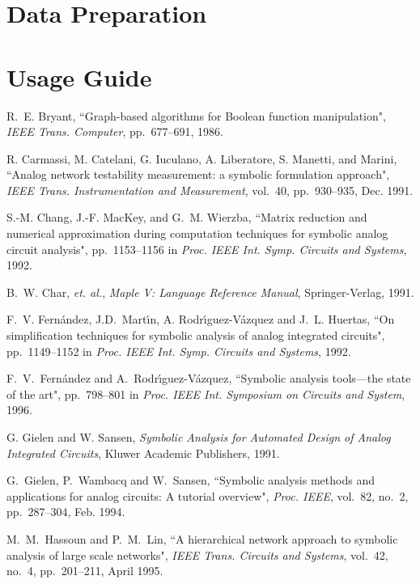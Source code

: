 \section{Data Preparation}


\section{Usage Guide}
\label{sec:usage}

\begin{thebibliography}{99}

R.~E. Bryant,
``Graph-based algorithms for Boolean function manipulation",
{\it IEEE Trans. Computer}, pp.~677--691, 1986.

R. Carmassi, M. Catelani, G. Iuculano, A. Liberatore,
S. Manetti, and Marini,
``Analog network testability measurement:
a symbolic formulation approach",
{\it IEEE Trans. Instrumentation and Measurement},
vol.~40, pp.~930--935, Dec. 1991.

S.-M. Chang, J.-F. MacKey, and G.~M. Wierzba,
``Matrix reduction and numerical approximation
during computation techniques for symbolic analog
circuit analysis",
pp.~1153--1156 in
{\it Proc. IEEE Int. Symp. Circuits and Systems},
1992.

B.~W. Char, {\it et. al.},
{\it Maple V: Language Reference Manual},
Springer-Verlag,  1991.

F.~V. Fern\'{a}ndez, J.D.~Mart\'{\i}n, A. Rodr\'{\i}guez-V\'{a}zquez 
and J.~L. Huertas, 
``On simplification techniques for symbolic
analysis of analog integrated circuits", 
pp.~1149--1152 in {\it Proc. IEEE Int. Symp. Circuits and Systems}, 1992.

F.~V.~Fern\'andez and A.~Rodr\'{\i}guez-V\'azquez,
``Symbolic analysis tools---the state of the art", pp.~798--801 in 
{\it Proc. IEEE Int. Symposium on Circuits and System}, 1996.

G. Gielen and W. Sansen,
{\em Symbolic Analysis for Automated Design of Analog Integrated Circuits}, 
Kluwer Academic Publishers, 1991.

G.~Gielen, P.~Wambacq and W.~Sansen,
``Symbolic analysis methods and applications for 
analog circuits: A tutorial overview",
{\it Proc. IEEE}, vol.~82, no.~2, pp.~287--304, Feb. 1994. 

M.~M.~Hassoun and P.~M.~Lin,
``A hierarchical network approach to symbolic analysis of large
scale networks",
{\it IEEE Trans. Circuits and Systems}, vol.~42, no.~4,
pp.~201--211, April 1995.


\end{thebibliography}
